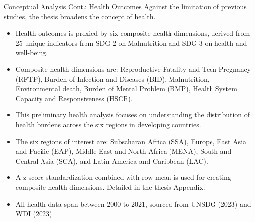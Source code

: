 \documentclass[aspectratio=169,handout, 10pt]{beamer}
\begin{document}
\begin{frame}{Conceptual Analysis Cont.: Health Outcomes}
Against the limitation of previous studies, the thesis broadens the concept of health. 

\begin{itemize}
    \item Health outcomes is proxied by six composite health dimensions, derived from 25 unique indicators from SDG 2 on Malnutrition and SDG 3 on health and well-being.
    \item Composite health dimensions are: Reproductive Fatality and Teen Pregnancy (RFTP), Burden of Infection and Diseases (BID), Malnutrition, Environmental death, Burden of Mental Problem (BMP), Health System Capacity and Responsiveness (HSCR).  
    \item This preliminary health analysis focuses on understanding the distribution of health burdens across the six regions in developing countries. 
    \item The six regions of interest are: Subsaharan Africa (SSA), Europe, East Asia and Pacific (EAP), Middle East and North Africa (MENA), South and Central Asia (SCA), and Latin America and Caribbean (LAC). 
    \item A z-score standardization combined with row mean is used for creating composite health dimensions. Detailed in the thesis Appendix. 
    \item All health data span between 2000 to 2021, sourced from UNSDG (2023) and WDI (2023)
\end{itemize}  


\end{frame}
\end{document}

